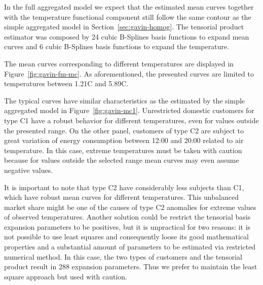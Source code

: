 In the full aggregated model we expect that the estimated mean curves together with the temperature functional component still follow the same contour as the simple aggregated model in Section~\ref{sec:gavin-homog}. The tensorial product estimator was composed by 24 cubic B-Splines basis functions to expand mean curves and 6 cubic B-Splines basis functions to expand the temperature.

The mean curves corresponding to different temperatures are displayed in Figure~\ref{fig:gavin-fm-mc}. As aforementioned, the presented curves are limited to temperatures between 1.21\textdegree C and 5.89\textdegree C. 

The typical curves have similar characteristics as the estimated by the simple aggregated model in Figure~\ref{fig:gavin-mc1}. Unrestricted domestic customers for type C1 have a robust behavior for different temperatures, even for values outside the presented range. On the other panel, customers of type C2 are subject to great variation of energy consumption between 12:00 and 20:00 related to air temperature. In this case, extreme temperatures must be taken with caution because for values outside the selected range mean curves may even assume negative values.

It is important to note that type C2 have considerably less subjects than C1, which have robust mean curves for different temperatures. This unbalanced market share might be one of the causes of type C2 anomalies for extreme values of observed temperatures. Another solution could be restrict the tensorial basis expansion parameters to be positives, but it is unpractical for two reasons: it is not possible to use least squares and consequently loose its good mathematical properties and a substantial amount of parameters to be estimated via restricted numerical method. In this case, the two types of customers and the tensorial product result in 288 expansion parameters. Thus we prefer to maintain the least square approach but used with caution.

